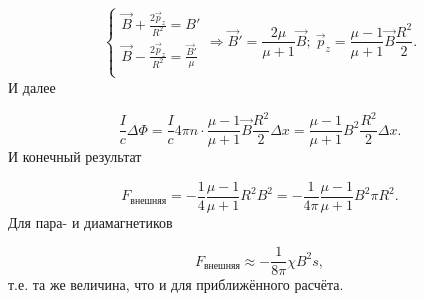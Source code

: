 \begin{equation*}
  \begin{cases}
    \vec B + \frac{2\vec p_z}{R^2} = B'\\
    \vec B - \frac{2\vec p_z}{R^2} = \frac{\vec B'}{\mu}\\
  \end{cases}
  \Rightarrow \vec B' = \frac{2\mu}{\mu + 1} \vec B;~\vec p_z = \frac{\mu - 1}{\mu + 1} \vec B \frac{R^2}{2}.
\end{equation*}
И далее 

\begin{equation*}
	\frac{I}{c}\Delta \Phi = \frac{I}{c} 4\pi n \cdot \frac{\mu - 1}{\mu + 1} \vec B \frac{R^2}{2} \Delta x = \frac{\mu - 1}{\mu + 1} B^2 \frac{R^2}{2} \Delta x.
\end{equation*}
И конечный результат

\begin{equation*}
	F_{\text{внешняя}} = - \frac{1}{4} \frac{\mu - 1}{\mu + 1} R^2 B^2 = - \frac{1}{4\pi} \frac{\mu - 1}{\mu + 1} B^2 \pi R^2.
\end{equation*}
Для пара- и диамагнетиков

\begin{equation*}
	F_{\text{внешняя}} \approx - \frac{1}{8\pi} \chi B^2 s,
\end{equation*}
т.е. та же величина, что и для приближённого расчёта.



